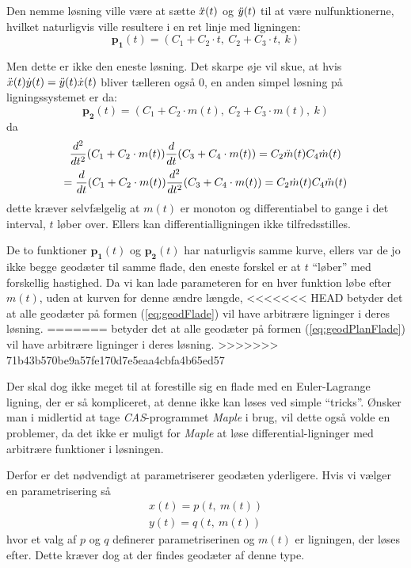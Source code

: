Den nemme løsning ville være at sætte \(\ddot{x}(t)\) og \(\ddot{y}(t)\) til at være nulfunktionerne,
hvilket naturligvis ville resultere i en ret linje med ligningen:
\begin{equation*}
\pmb{p_1}(t) = (C_1 + C_2\cdot t,~C_2 + C_3\cdot t,~k)
\end{equation*}

Men dette er ikke den eneste løsning. Det skarpe øje vil skue, at hvis
\( \ddot{x}(t)\dot{y}(t) = \ddot{y}(t)\dot{x}(t) \)
bliver tælleren også \(0\), en anden simpel løsning på ligningssystemet er da:
\begin{equation*}
\pmb{p_2}(t) = (C_1 + C_2\cdot m(t),~C_2 + C_3\cdot m(t),~k)
\end{equation*}
da
\begin{equation*}
\begin{gathered}
\frac{d^2}{dt^2} (C_1 + C_2\cdot m(t)) \frac{d}{dt} (C_3 + C_4\cdot m(t)) = C_2\ddot{m}(t) C_4\dot{m}(t) \\
 = \frac{d}{dt} (C_1 + C_2\cdot m(t)) \frac{d^2}{dt^2} (C_3 + C_4\cdot m(t)) = C_2\dot{m}(t) C_4\ddot{m}(t) 
\end{gathered}
\end{equation*}
dette kræver selvfælgelig at \( m(t) \) er monoton og differentiabel to gange i det interval, \(t\) løber over.
Ellers kan differentialligningen ikke tilfredsstilles.

De to funktioner \(\pmb{p_1}(t)\) og \(\pmb{p_2}(t)\) har naturligvis samme kurve,
ellers var de jo ikke begge geodæter til samme flade, den eneste forskel er at \(t\) ``løber'' med forskellig hastighed.
Da vi kan lade parameteren for en hver funktion løbe efter \(m(t)\), uden at kurven for denne ændre længde,
<<<<<<< HEAD
betyder det at alle geodæter på formen (\ref{eq:geodFlade}) vil have arbitrære ligninger i deres løsning.
=======
betyder det at alle geodæter på formen (\ref{eq:geodPlanFlade}) vil have arbitrære ligninger i deres løsning.
>>>>>>> 71b43b570be9a57fe170d7e5eaa4cbfa4b65ed57

Der skal dog ikke meget til at forestille sig en flade med en Euler-Lagrange ligning, der er så kompliceret,
at denne ikke kan løses ved simple ``tricks''. Ønsker man i midlertid at tage \emph{CAS}-programmet \emph{Maple}
i brug, vil dette også volde en problemer,
da det ikke er muligt for \emph{Maple} at løse differential-ligninger med arbitrære funktioner i løsningen.

Derfor er det nødvendigt at parametriserer geodæten yderligere. Hvis vi vælger en parametrisering så
\begin{gather*}
x(t) = p(t,~m(t))\\
y(t) = q(t,~m(t))
\end{gather*}
hvor et valg af \(p\) og \(q\) definerer parametriserinen og \(m(t)\) er ligningen, der løses efter.
Dette kræver dog at der findes geodæter af denne type.

